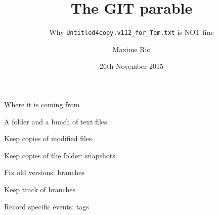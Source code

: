 \documentclass[english]{slides}
\title{The GIT parable}
\subtitle{Why \texttt{Untitled4copy.v112\_for\_Tom.txt} is NOT fine}
\author{Maxime Rio}
\date{26th November 2015}
\renewcommand{\maketitle}{%
  \nocount{
    \frame[plain]{\titlepage}
  }
}
\begin{document}
\maketitle

\begin{frame}{Where it is coming from}
\end{frame}

\begin{frame}{A folder and a bunch of text files}
\end{frame}

\begin{frame}{Keep copies of modified files}
\end{frame}

\begin{frame}{Keep copies of the folder: snapshots}

\end{frame}

\begin{frame}{Fix old versions: branches}

\end{frame}

\begin{frame}{Keep track of branches}
\end{frame}

\begin{frame}{Record specific events: tags}
\end{frame}
\end{document}
